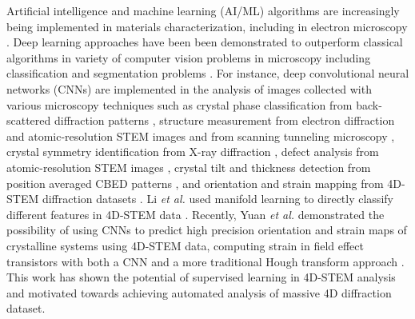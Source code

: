 \documentclass[%
 reprint,
superscriptaddress,
 amsmath,
 amssymb,
 prl,
]{revtex4-2}
\begin{document}
Artificial intelligence and machine learning (AI/ML) algorithms are increasingly being implemented in materials characterization, including in electron microscopy \citep{Ede_2021}. Deep learning approaches have been been demonstrated to outperform classical algorithms in variety of computer vision problems in microscopy including classification and segmentation problems \citep{George2020CASSPERAS, roberts2019deep, Ziatdinov2019}. For instance, deep convolutional neural networks (CNNs) are implemented in the analysis of images collected with various microscopy techniques such as crystal phase classification from back-scattered diffraction patterns \cite{Kaufmann2020}, structure measurement from electron diffraction and atomic-resolution STEM images \cite{Aguiar2019} and from scanning tunneling microscopy \cite{vasudevan2018mapping}, crystal symmetry identification from X-ray diffraction \cite{tiong2020identification}, defect analysis from atomic-resolution STEM images \cite{ChiaHao2020DLStrainMappingDefects}, crystal tilt and thickness detection from position averaged CBED patterns \cite{zhang2020atomic,xu2018deep}, and orientation and strain mapping from 4D-STEM diffraction datasets \cite{li2019manifold, yuan2021training}. Li \textit{et al.} used manifold learning to directly classify different features in 4D-STEM data \cite{li2019manifold}. Recently, Yuan \textit{et al.} demonstrated the possibility of using CNNs to predict high precision orientation and strain maps of crystalline systems using 4D-STEM data, computing strain in field effect transistors with both a CNN and a more traditional Hough transform approach \cite{yuan2021training}.  This work has shown the potential of supervised learning in 4D-STEM analysis and motivated towards achieving automated analysis of massive 4D diffraction dataset. 

\end{document}
